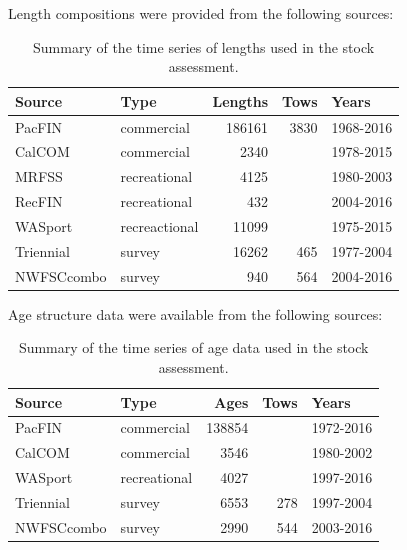 \documentclass[12pt,]{article}
\begin{document}
Length compositions were provided from the following sources:

\vspace{.5cm}

\begin{table}[ht]
\centering
\caption{Summary of the time series of lengths used in the stock assessment.} 
\label{tab:Length_sources}
\begin{tabular}{llrrl}
  \hline
Source & Type & Lengths & Tows & Years \\ 
  \hline
PacFIN & commercial & 186161 & 3830 & 1968-2016 \\ 
  CalCOM & commercial & 2340 &  & 1978-2015 \\ 
  MRFSS & recreational & 4125 &  & 1980-2003 \\ 
  RecFIN & recreational & 432 &  & 2004-2016 \\ 
  WASport & recreactional & 11099 &  & 1975-2015 \\ 
  Triennial & survey & 16262 & 465 & 1977-2004 \\ 
  NWFSCcombo & survey & 940 & 564 & 2004-2016 \\ 
   \hline
\end{tabular}
\end{table}

Age structure data were available from the following sources:
\vspace{.5cm}

\begin{table}[ht]
\centering
\caption{Summary of the
                                              time series of age data used in the stock
                                              assessment.} 
\label{tab:Age_sources}
\begin{tabular}{llrrl}
  \hline
Source & Type & Ages & Tows & Years \\ 
  \hline
PacFIN & commercial & 138854 &  & 1972-2016 \\ 
  CalCOM & commercial & 3546 &  & 1980-2002 \\ 
  WASport & recreational & 4027 &  & 1997-2016 \\ 
  Triennial & survey & 6553 & 278 & 1997-2004 \\ 
  NWFSCcombo & survey & 2990 & 544 & 2003-2016 \\ 
   \hline
\end{tabular}
\end{table}

\FloatBarrier
\newpage
\clearpage
\FloatBarrier
\end{document}
